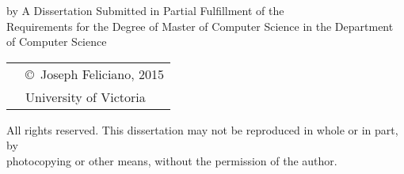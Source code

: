 \pagebreak
{
\centering
\thesistitle
\tpbreak
by
\tpbreak
\nameanddegrees
\vspace{3cm}
A Dissertation Submitted in Partial Fulfillment of the \\
Requirements for the Degree of
\tpbreak
Master of Computer Science
\tpbreak
in the Department of Computer Science\\
\vfill
\begin{tabular}{cl}
& \copyright\ Joseph Feliciano, 2015\\
& \phantom{\copyright} University of Victoria
\end{tabular}
\tpbreak
All rights reserved. This dissertation may not be reproduced in whole or in part, by \\
\hfill photocopying or other means, without the permission of the author.
\hfill
}
\pagebreak
